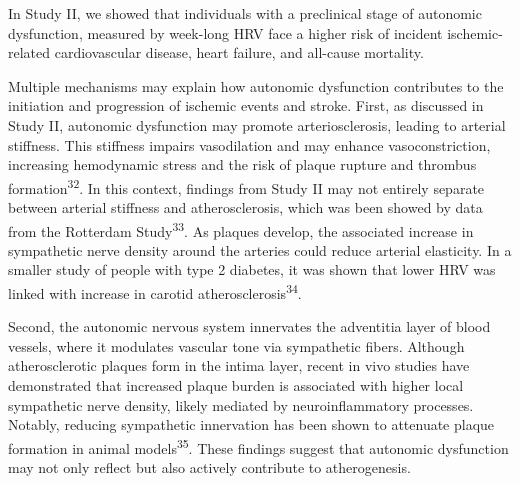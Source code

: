 \documentclass[
  a4paper,
  headsepline=true,
  open=any]{scrbook}
\begin{document}
In Study II, we showed that individuals with a preclinical stage of
autonomic dysfunction, measured by week-long HRV face a higher risk of
incident ischemic-related cardiovascular disease, heart failure, and
all-cause mortality.

Multiple mechanisms may explain how autonomic dysfunction contributes to
the initiation and progression of ischemic events and stroke. First, as
discussed in Study II, autonomic dysfunction may promote
arteriosclerosis, leading to arterial stiffness. This stiffness impairs
vasodilation and may enhance vasoconstriction, increasing hemodynamic
stress and the risk of plaque rupture and thrombus
formation\textsuperscript{32}. In this context, findings from Study II
may not entirely separate between arterial stiffness and
atherosclerosis, which was been showed by data from the Rotterdam
Study\textsuperscript{33}. As plaques develop, the associated increase
in sympathetic nerve density around the arteries could reduce arterial
elasticity. In a smaller study of people with type 2 diabetes, it was
shown that lower HRV was linked with increase in carotid
atherosclerosis\textsuperscript{34}.

Second, the autonomic nervous system innervates the adventitia layer of
blood vessels, where it modulates vascular tone via sympathetic fibers.
Although atherosclerotic plaques form in the intima layer, recent in
vivo studies have demonstrated that increased plaque burden is
associated with higher local sympathetic nerve density, likely mediated
by neuroinflammatory processes. Notably, reducing sympathetic
innervation has been shown to attenuate plaque formation in animal
models\textsuperscript{35}. These findings suggest that autonomic
dysfunction may not only reflect but also actively contribute to
atherogenesis.
\end{document}
